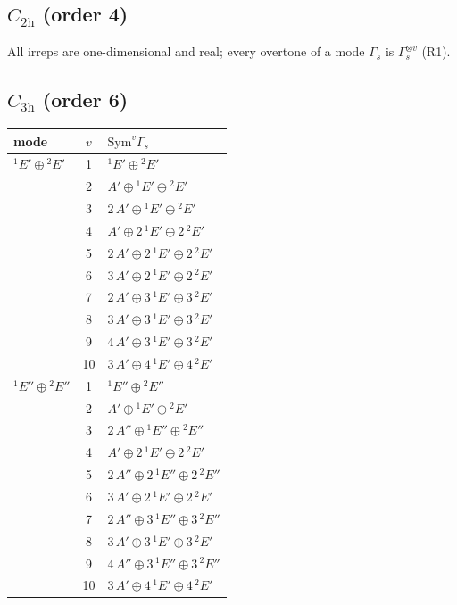 \documentclass[11pt]{article}
\begin{document}
\subsection*{$C_{2\mathrm{h}}$ \quad (order 4)}
All irreps are one-dimensional and real; every overtone of a mode $\Gamma_s$ is $\Gamma_s^{\otimes v}$ (R1).

\subsection*{$C_{3\mathrm{h}}$ \quad (order 6)}
\begin{longtable}{l c p{}}
\hline mode & $v$ & $\mathrm{Sym}^v\Gamma_s$\\ \hline\endhead
${}^{1}E'\oplus {}^{2}E'$ & 1 & ${}^{1}E'\oplus {}^{2}E'$\\
 & 2 & $A'\oplus {}^{1}E'\oplus {}^{2}E'$\\
 & 3 & $2\,A'\oplus {}^{1}E'\oplus {}^{2}E'$\\
 & 4 & $A'\oplus 2\,{}^{1}E'\oplus 2\,{}^{2}E'$\\
 & 5 & $2\,A'\oplus 2\,{}^{1}E'\oplus 2\,{}^{2}E'$\\
 & 6 & $3\,A'\oplus 2\,{}^{1}E'\oplus 2\,{}^{2}E'$\\
 & 7 & $2\,A'\oplus 3\,{}^{1}E'\oplus 3\,{}^{2}E'$\\
 & 8 & $3\,A'\oplus 3\,{}^{1}E'\oplus 3\,{}^{2}E'$\\
 & 9 & $4\,A'\oplus 3\,{}^{1}E'\oplus 3\,{}^{2}E'$\\
 & 10 & $3\,A'\oplus 4\,{}^{1}E'\oplus 4\,{}^{2}E'$\\
\hline
${}^{1}E''\oplus {}^{2}E''$ & 1 & ${}^{1}E''\oplus {}^{2}E''$\\
 & 2 & $A'\oplus {}^{1}E'\oplus {}^{2}E'$\\
 & 3 & $2\,A''\oplus {}^{1}E''\oplus {}^{2}E''$\\
 & 4 & $A'\oplus 2\,{}^{1}E'\oplus 2\,{}^{2}E'$\\
 & 5 & $2\,A''\oplus 2\,{}^{1}E''\oplus 2\,{}^{2}E''$\\
 & 6 & $3\,A'\oplus 2\,{}^{1}E'\oplus 2\,{}^{2}E'$\\
 & 7 & $2\,A''\oplus 3\,{}^{1}E''\oplus 3\,{}^{2}E''$\\
 & 8 & $3\,A'\oplus 3\,{}^{1}E'\oplus 3\,{}^{2}E'$\\
 & 9 & $4\,A''\oplus 3\,{}^{1}E''\oplus 3\,{}^{2}E''$\\
 & 10 & $3\,A'\oplus 4\,{}^{1}E'\oplus 4\,{}^{2}E'$\\
\hline
\end{longtable}
\end{document}
